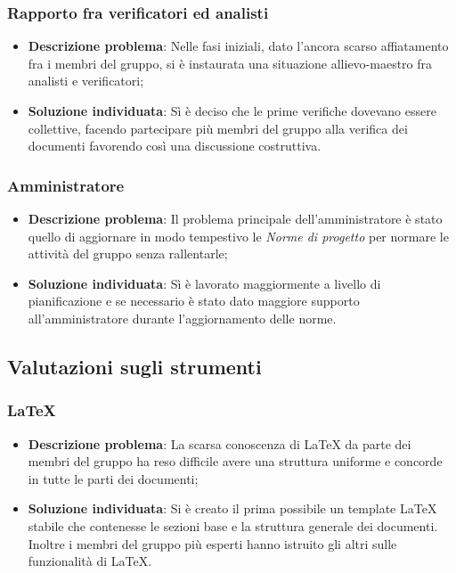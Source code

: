 	\subsubsection{Rapporto fra verificatori ed analisti}
		\begin{itemize}
			\item \textbf{Descrizione problema}: Nelle fasi iniziali, dato l'ancora scarso affiatamento fra i membri del gruppo, si è instaurata una situazione allievo-maestro fra analisti e verificatori;
			\item \textbf{Soluzione individuata}: Sì è deciso che le prime verifiche dovevano essere collettive, facendo partecipare più membri del gruppo alla verifica dei documenti favorendo così una discussione costruttiva.
		\end{itemize}
	\subsubsection{Amministratore}
		\begin{itemize}
			\item \textbf{Descrizione problema}: Il problema principale dell'amministratore è stato quello di aggiornare in modo tempestivo le \textit{Norme di progetto} per normare le attività del gruppo senza rallentarle;
			\item \textbf{Soluzione individuata}: Sì è lavorato maggiormente a livello di pianificazione e se necessario è stato dato maggiore supporto all'amministratore durante l'aggiornamento delle norme.
		\end{itemize}
\subsection{Valutazioni sugli strumenti}
	\subsubsection{\LaTeX}
		\begin{itemize}
			\item \textbf{Descrizione problema}: La scarsa conoscenza di \LaTeX\xspace da parte dei membri del gruppo ha reso difficile avere una struttura uniforme e concorde in tutte le parti dei documenti;
			\item \textbf{Soluzione individuata}: Si è creato il prima possibile un template \LaTeX\xspace stabile che contenesse le sezioni base e la struttura generale dei documenti. Inoltre i membri del gruppo più esperti hanno istruito gli altri sulle funzionalità di \LaTeX.
		\end{itemize}
